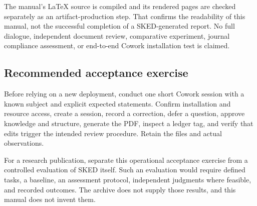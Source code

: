 \documentclass[12pt,a4paper]{article}
\begin{document}
The manual's LaTeX source is compiled and its rendered pages are checked separately as an artifact-production step. That confirms the readability of this manual, not the successful completion of a SKED-generated report. No full dialogue, independent document review, comparative experiment, journal compliance assessment, or end-to-end Cowork installation test is claimed.

\subsection{Recommended acceptance exercise}
Before relying on a new deployment, conduct one short Cowork session with a known subject and explicit expected statements. Confirm installation and resource access, create a session, record a correction, defer a question, approve knowledge and structure, generate the PDF, inspect a ledger tag, and verify that edits trigger the intended review procedure. Retain the files and actual observations.

For a research publication, separate this operational acceptance exercise from a controlled evaluation of SKED itself. Such an evaluation would require defined tasks, a baseline, an assessment protocol, independent judgments where feasible, and recorded outcomes. The archive does not supply those results, and this manual does not invent them.

\appendix
\end{document}

